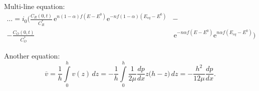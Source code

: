 	Multi-line equation:
	\begin{equation}
	\label{eq:sec2.BV_equation}
		\begin{split}
			\hdots = i_0 \bigg( \frac{C_R(0, t)}{C_R^*}\,\mathrm{e}^{n(1-\alpha)f(E-E^0)}\mathrm{e}^{-nf(1-\alpha)(E_{eq}-E^0)} &- \\
			-\frac{C_O(0, t)}{C_O^*}&\,\mathrm{e}^{-n\alpha f (E- E^0)}\mathrm{e}^{n\alpha f(E_{eq}-E^0)} \bigg)
		\end{split}
	\end{equation}

	Another equation:
	\begin{equation}
		\label{eq:sec2.plane_hagen_poiseuille_flow_profile_avg_vel}
		\overline{v} = \frac{1}{h} \int\limits_{0}^{h} v(z) \, dz = -\frac{1}{h} \int\limits_{0}^{h} \frac{1}{2\mu} \frac{dp}{dx} z\big(h-z\big) \, dz = -\frac{h^2}{12\mu} \frac{dp}{dx}.
	\end{equation}

